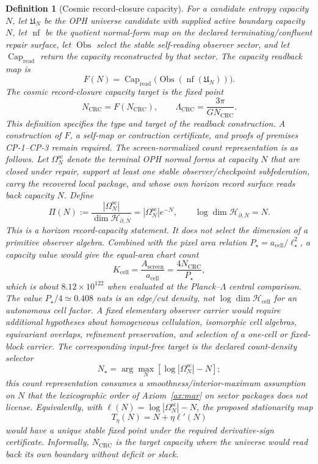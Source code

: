 \documentclass[11pt]{article}
\newtheorem{definition}[theorem]{Definition}
\begin{document}
\begin{definition}[Cosmic record-closure capacity]\label{def:self-closure-density}
For a candidate entropy capacity \(N\), let \(\mathfrak U_N\) be the OPH universe candidate with
supplied active boundary capacity \(N\), let \(\operatorname{nf}\) be the quotient normal-form map
on the declared terminating/confluent repair surface, let \(\operatorname{Obs}\) select the stable
self-reading observer sector, and let \(\operatorname{Cap}_{\mathrm{read}}\) return the capacity
reconstructed by that sector. The capacity readback map is
\[
F(N)=
\operatorname{Cap}_{\mathrm{read}}
\bigl(\operatorname{Obs}(\operatorname{nf}(\mathfrak U_N))\bigr).
\]
The cosmic record-closure capacity target is the fixed point
\[
N_{\mathrm{CRC}}=F(N_{\mathrm{CRC}}),
\qquad
\Lambda_{\mathrm{CRC}}=\frac{3\pi}{G N_{\mathrm{CRC}}}.
\]
This definition specifies the type and target of the readback construction. A construction of
\(F\), a self-map or contraction certificate, and proofs of premises CP-1--CP-3 remain required.
The screen-normalized count representation is as follows. Let \(\Omega^{\mathrm{sc}}_N\) denote
the terminal OPH normal forms at capacity \(N\) that are closed under repair, support at least one
stable observer/checkpoint subfederation, carry the recovered local package, and whose own horizon
record surface reads back capacity \(N\). Define
\[
\Pi(N):=\frac{|\Omega^{\mathrm{sc}}_N|}{\dim \mathcal H_{\partial,N}}
=|\Omega^{\mathrm{sc}}_N|e^{-N},
\qquad
\log\dim \mathcal H_{\partial,N}=N.
\]
This is a horizon record-capacity statement. It does not select the dimension of a primitive
observer algebra. Combined with the pixel area relation
\(P_\star=a_{\mathrm{cell}}/\ell_\star^2\), a capacity value would give the equal-area chart count
\[
K_{\mathrm{cell}}
=\frac{A_{\mathrm{screen}}}{a_{\mathrm{cell}}}
=\frac{4N_{\mathrm{CRC}}}{P_\star},
\]
which is about \(8.12\times10^{122}\) when evaluated at the Planck--\(\Lambda\) central comparison.
The value
\(P_\star/4\simeq0.408\) nats is an edge/cut density, not
\(\log\dim\mathcal H_{\mathrm{cell}}\) for an autonomous cell factor. A fixed elementary observer
carrier would require additional hypotheses about homogeneous cellulation, isomorphic cell
algebras, equivariant overlaps, refinement preservation, and selection of a one-cell or fixed-block
carrier.
The corresponding input-free target is the declared count-density selector
\[
N_\star=\arg\max_N\left[\log|\Omega^{\mathrm{sc}}_N|-N\right];
\]
this count representation consumes a smoothness/interior-maximum assumption on \(N\) that the
lexicographic order of Axiom~\ref{ax:mar} on sector packages does not license.
Equivalently, with \(\ell(N)=\log|\Omega^{\mathrm{sc}}_N|-N\), the proposed stationarity map
\[
T_\eta(N)=N+\eta\ell'(N)
\]
would have a unique stable fixed point under the required derivative-sign certificate. Informally,
\(N_{\mathrm{CRC}}\) is the target capacity where the universe would read back its own boundary
without deficit or slack.
\end{definition}
\end{document}
